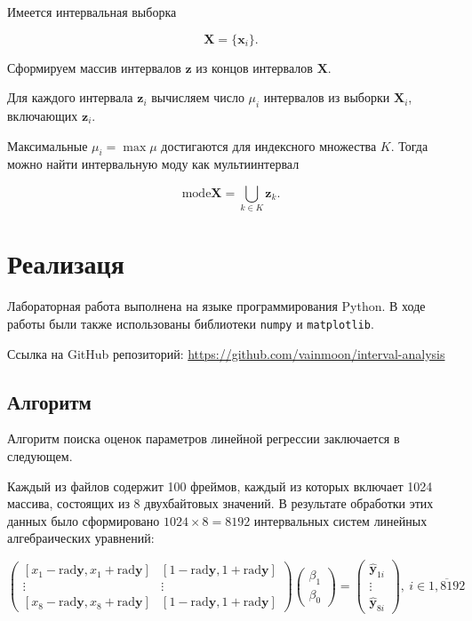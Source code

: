\documentclass{article}
\begin{document}
  Имеется интервальная выборка

  \[
    \mathbf{X} = \{ \mathbf{x}_i \}.
  \]

  Сформируем массив интервалов \( \mathbf{z} \) из концов интервалов
  \( \mathbf{X} \).

  Для каждого интервала \( \mathbf{z}_i \) вычисляем число \( \mu_i \)
  интервалов из выборки \( \mathbf{X}_i \), включающих \( \mathbf{z}_i \).

  Максимальные \( \mu_i = \max \mu \) достигаются для индексного множества
  \( K \). Тогда можно найти интервальную моду как мультиинтервал

  \begin{equation}
    \text{mode} \mathbf{X} = \bigcup_{k \in K} \mathbf{z}_k.
  \end{equation}

  \section{Реализаця}

  Лабораторная работа выполнена на языке программирования Python. В ходе
  работы были также использованы библиотеки \verb!numpy! и
  \verb!matplotlib!.


  Ссылка на GitHub репозиторий:
  \url{https://github.com/vainmoon/interval-analysis}

  \subsection{Алгоритм}
  Алгоритм поиска оценок параметров линейной регрессии заключается в следующем.

  Каждый из файлов содержит 100 фреймов, каждый из которых включает
  1024 массива, состоящих из 8 двухбайтовых значений. В результате
  обработки этих данных было сформировано \( 1024 \times 8 = 8192 \)
  интервальных систем линейных алгебраических уравнений: 

  \[
    \begin{pmatrix}
    [x_1 - \text{rad} \mathbf{y}, x_1 + \text{rad} \mathbf{y}] &
    [1 - \text{rad} \mathbf{y}, 1 + \text{rad} \mathbf{y}] \\
    \vdots & \vdots \\
    [x_8 - \text{rad} \mathbf{y}, x_8 + \text{rad} \mathbf{y}] &
    [1 - \text{rad} \mathbf{y}, 1 + \text{rad} \mathbf{y}]
    \end{pmatrix}
    \begin{pmatrix}
    \beta_1 \\
    \beta_0
    \end{pmatrix}
    = \begin{pmatrix}
    \hat{\mathbf{y}}_{1i} \\
    \vdots \\
    \hat{\mathbf{y}}_{8i}
    \end{pmatrix}, \ i \in \overline{1,8192}
  \]
\end{document}
